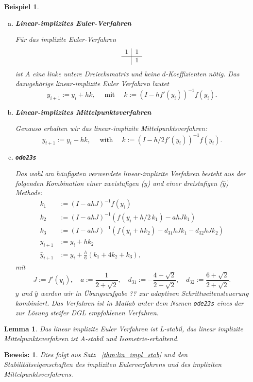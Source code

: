 \documentclass[12pt,a4paper]{book}
\theoremstyle{break}
\newtheorem{lemma}[theorem]{Lemma}
\newtheorem{beispiel}[theorem]{Beispiel}
\theoremstyle{nonumberplain}
\newtheorem{beweis}{Beweis:}
\newcommand{\1}{\mathbbm{1}} 			      	%
\begin{document}
\begin{beispiel}\label{bsp:lin_impl}
\begin{enumerate}[(a)]
\item {\bf Linear-implizites Euler-Verfahren}

Für das implizite Euler-Verfahren
\[
\begin{array}{c | c}
1 & 1 \\ \hline 
& 1
\end{array}
\]
ist $A$ eine linke untere Dreiecksmatrix und keine $d$-Koeffizienten nötig. Das dazugehörige \emph{linear-implizite Euler Verfahren} lautet
\[
y_{i+1}:=y_i+hk, \quad \mbox{ mit } \quad k:=(I-hf'(y_i))^{-1} f(y_i).
\]
\item {\bf Linear-implizites Mittelpunktsverfahren}

Genauso erhalten wir das \emph{linear-implizite Mittelpunktsverfahren}:
\[
y_{i+1}:=y_i+hk, \quad \mbox{ with } \quad k:=(I-h/2 f'(y_i))^{-1} f(y_i).
\]
 
\item  {\bf\tt ode23s} 

Das wohl am häufigsten verwendete linear-implizite Verfahren besteht aus der folgenden Kombination 
einer zweistufigen ($y$) und einer dreistufigen ($\hat y$) Methode:
\begin{align*}
k_1&:=(I-ahJ)^{-1} f(y_i)\\
k_2&:=(I-ahJ)^{-1} \left( f(y_i+h/2\, k_1)-ahJk_1\right)\\
k_3&:=(I-ahJ)^{-1} \left( f(y_i+h k_2)-d_{31}hJk_1 - d_{32} hJk_2 \right)\\[+1ex]
y_{i+1}&:=y_i+hk_2\\
\hat y_{i+1}&:=y_i+\frac{h}{6} (k_1+4 k_2 + k_3),
\end{align*}
mit
\[
J:=f'(y_i), \quad a:=\frac{1}{2+\sqrt{2}}, \quad d_{31}:=-\frac{4+\sqrt{2}}{2+\sqrt{2}}, \quad d_{32}:=\frac{6+\sqrt{2}}{2+\sqrt{2}}.
\]
$y$ und $\hat y$ werden wir in Übungsaufgabe ?? zur adaptiven Schrittweitensteuerung kombiniert. 
Das Verfahren ist in Matlab unter dem Namen {\tt ode23s} eines der zur Lösung steifer DGL empfohlenen Verfahren.
\end{enumerate}
\end{beispiel}


\begin{lemma}\label{lemma:stab_lin_impl}
Das linear implizite Euler Verfahren ist L-stabil, das linear implizite Mittelpunktsverfahren ist A-stabil und
Isometrie-erhaltend.
\end{lemma}
\begin{beweis}
Dies folgt aus Satz ~\ref{thm:lin_impl_stab} und den Stabilitätseigenschaften des impliziten Eulerverfahrens und
des impliziten Mittelpunktsverfahrens.
\end{beweis}
\end{document}
